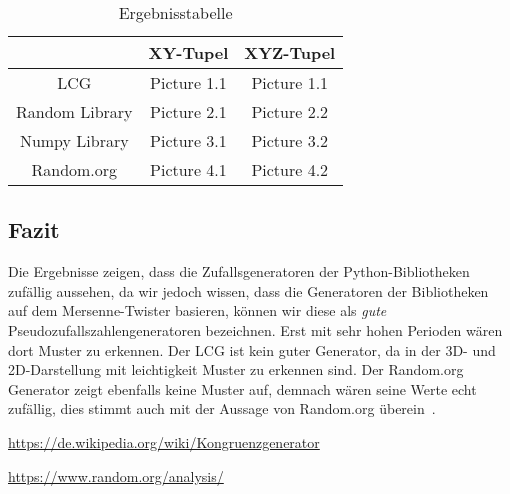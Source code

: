 \documentclass[12pt]{article}
\begin{document}
    \begin{table}[h]

        \caption[Ergebnisstabelle]{Ergebnisstabelle}

        \centering

        \begin{tabular}{|c||c|c|}

            \hline
            & XY-Tupel & XYZ-Tupel \\

            \hline
            \hline
            LCG & Picture 1.1 & Picture 1.1 \\

            \hline
            Random Library & Picture 2.1 & Picture 2.2 \\

            \hline
            Numpy Library & Picture 3.1 & Picture 3.2 \\

            \hline
            Random.org & Picture 4.1 & Picture 4.2 \\

            \hline

        \end{tabular}\label{tab:ergebnisse}

    \end{table}

    \subsection{Fazit}\label{subsec:fazit}
    Die Ergebnisse zeigen, dass die Zufallsgeneratoren der Python-Bibliotheken zufällig aussehen, da wir jedoch wissen,
    dass die Generatoren der Bibliotheken auf dem Mersenne-Twister basieren,
    können wir diese als \textit{gute} Pseudozufallszahlengeneratoren bezeichnen.
    Erst mit sehr hohen Perioden wären dort Muster zu erkennen.
    Der LCG ist kein guter Generator, da in der 3D- und 2D-Darstellung mit leichtigkeit Muster zu erkennen sind.
    Der Random.org Generator zeigt ebenfalls keine Muster auf, demnach wären seine Werte echt zufällig,
    dies stimmt auch mit der Aussage von Random.org überein~\cite{random-org}.


    \vfill

    \begin{thebibliography}{12345}

        \url{https://de.wikipedia.org/wiki/Kongruenzgenerator}

        \url{https://www.random.org/analysis/}

    \end{thebibliography}
\end{document}
